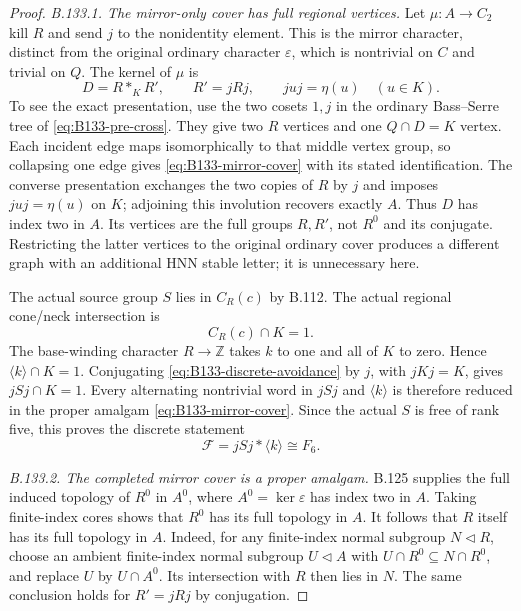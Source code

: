 \begin{proof}
\emph{B.133.1. The mirror-only cover has full regional vertices.}
Let $\mu:A\to C_2$ kill $R$ and send $j$ to the nonidentity
element. This is the mirror character, distinct from the original
ordinary character $\varepsilon$, which is nontrivial on $C$ and
trivial on $Q$. The kernel of $\mu$ is
\begin{equation}\label{eq:B133-mirror-cover}
 D=R*_{K}R',\qquad R'=jRj,
 \qquad juj=\eta(u)\quad(u\in K).
\end{equation}
To see the exact presentation, use the two cosets $1,j$ in the
ordinary Bass--Serre tree of \eqref{eq:B133-pre-cross}. They give
two $R$ vertices and one $Q\cap D=K$ vertex. Each incident edge
maps isomorphically to that middle vertex group, so collapsing
one edge gives \eqref{eq:B133-mirror-cover} with its stated
identification. The converse presentation exchanges the two
copies of $R$ by $j$ and imposes $juj=\eta(u)$ on $K$;
adjoining this involution recovers exactly $A$.
Thus $D$ has index two in $A$. Its vertices are the full groups
$R,R'$, not $R^0$ and its conjugate. Restricting the latter vertices
to the original ordinary cover produces a different graph with an
additional HNN stable letter; it is unnecessary here.

The actual source group $S$ lies in $C_R(c)$ by B.112.
The actual regional cone/neck intersection is
\begin{equation}\label{eq:B133-discrete-avoidance}
 C_R(c)\cap K=1.
\end{equation}
The base-winding character $R\to\mathbb Z$ takes $k$ to one and
all of $K$ to zero. Hence $\langle k\rangle\cap K=1$.
Conjugating \eqref{eq:B133-discrete-avoidance} by $j$, with
$jKj=K$, gives $jSj\cap K=1$. Every alternating nontrivial word
in $jSj$ and $\langle k\rangle$ is therefore reduced in the
proper amalgam \eqref{eq:B133-mirror-cover}. Since the actual
$S$ is free of rank five, this proves the discrete statement
\begin{equation}\label{eq:B133-discrete-free-source}
 \mathscr F=jSj*\langle k\rangle\cong F_6.
\end{equation}

\emph{B.133.2. The completed mirror cover is a proper amalgam.}
B.125 supplies the full induced topology of $R^0$ in $A^0$,
where $A^0=\ker\varepsilon$ has index two in $A$.
Taking finite-index cores shows that $R^0$ has its full topology
in $A$. It follows that $R$ itself has its full topology in $A$.
Indeed, for any finite-index normal subgroup $N\triangleleft R$,
choose an ambient finite-index normal subgroup $U\triangleleft A$
with $U\cap R^0\subseteq N\cap R^0$, and replace $U$ by
$U\cap A^0$. Its intersection with $R$ then lies in $N$.
The same conclusion holds for $R'=jRj$ by conjugation.


\end{proof}
